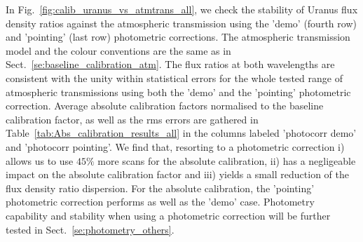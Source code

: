 In Fig.~\ref{fig:calib_uranus_vs_atmtrans_all}, we check the stability
of Uranus flux density ratios against the atmospheric transmission using
the 'demo' (fourth row) and 'pointing' (last row) photometric
corrections. The atmospheric transmission model and the colour
conventions are the same as in Sect.~\ref{se:baseline_calibration_atm}.
The flux ratios at both wavelengths are consistent with the
unity within statistical errors for the whole tested range of
atmospheric transmissions using both the 'demo' and the 'pointing'
photometric correction. Average absolute calibration factors normalised
to the baseline calibration factor, as well as the  rms errors are
gathered in Table~\ref{tab:Abs_calibration_results_all} in the columns
labeled 'photocorr demo' and 'photocorr pointing'. We find that,
resorting to a photometric correction i) allows us to use $45\%$ more
scans for the absolute calibration, ii) has a negligeable impact on
the absolute calibration factor and iii) yields a small reduction of
the flux density ratio dispersion. For the absolute calibration, the
'pointing' photometric correction performs as well as the 'demo' case.
Photometry capability and stability when using a photometric
correction will be further tested in Sect.~\ref{se:photometry_others}. 




